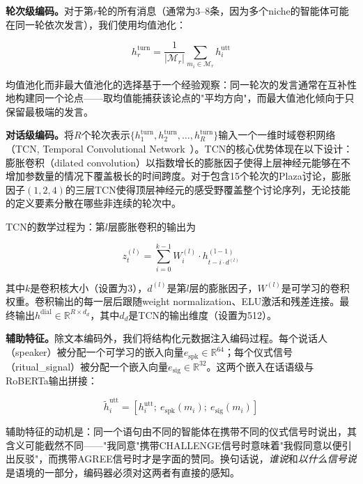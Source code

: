\documentclass[conference]{IEEEtran}
\begin{document}
\textbf{轮次级编码。}对于第$r$轮的所有消息（通常为3--8条，因为多个niche的智能体可能在同一轮依次发言），我们使用均值池化：

\begin{equation}
h_r^{\mathrm{turn}} = \frac{1}{|\mathcal{M}_r|} \sum_{m_i \in \mathcal{M}_r} h_i^{\mathrm{utt}}
\label{eq:turn_pool}
\end{equation}

均值池化而非最大值池化的选择基于一个经验观察：同一轮次的发言通常在互补性地构建同一个论点——取均值能捕获该论点的"平均方向"，而最大值池化倾向于只保留最极端的发言。

\textbf{对话级编码。}将$R$个轮次表示$\{h_1^{\mathrm{turn}}, h_2^{\mathrm{turn}}, \ldots, h_R^{\mathrm{turn}}\}$输入一个一维时域卷积网络（TCN, Temporal Convolutional Network~\cite{bai2018tcn}）。TCN的核心优势体现在以下设计：膨胀卷积（dilated convolution）以指数增长的膨胀因子使得上层神经元能够在不增加参数量的情况下覆盖极长的时间跨度。对于包含15个轮次的Plaza讨论，膨胀因子$(1,2,4)$的三层TCN使得顶层神经元的感受野覆盖整个讨论序列，无论技能的定义要素分散在哪些非连续的轮次中。

TCN的数学过程为：第$l$层膨胀卷积的输出为

\begin{equation}
z^{(l)}_t = \sum_{i=0}^{k-1} W^{(l)}_i \cdot h^{\mathrm{(l-1)}}_{t - i \cdot d^{(l)}}
\label{eq:tcn_dilated}
\end{equation}

其中$k$是卷积核大小（设置为3），$d^{(l)}$是第$l$层的膨胀因子，$W^{(l)}$是可学习的卷积权重。卷积输出的每一层后跟随weight normalization、ELU激活和残差连接。最终输出$h^{\mathrm{dial}} \in \mathbb{R}^{R \times d_d}$，其中$d_d$是TCN的输出维度（设置为512）。

\textbf{辅助特征。}除文本编码外，我们将结构化元数据注入编码过程。每个说话人（speaker）被分配一个可学习的嵌入向量$e_{\text{spk}} \in \mathbb{R}^{64}$；每个仪式信号（ritual\_signal）被分配一个嵌入向量$e_{\text{sig}} \in \mathbb{R}^{32}$。这两个嵌入在话语级与RoBERTa输出拼接：

\begin{equation}
\tilde{h}_i^{\mathrm{utt}} = [h_i^{\mathrm{utt}};\ e_{\text{spk}}(m_i);\ e_{\text{sig}}(m_i)]
\label{eq:utt_aug}
\end{equation}

辅助特征的动机是：同一个语句由不同的智能体在携带不同的仪式信号时说出，其含义可能截然不同——"我同意"携带CHALLENGE信号时意味着"我假同意以便引出反驳"，而携带AGREE信号时才是字面的赞同。换句话说，\emph{谁说}和\emph{以什么信号说}是语境的一部分，编码器必须对这两者有直接的感知。
\end{document}
